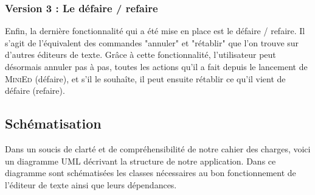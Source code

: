 \documentclass[a4paper]{article}
\begin{document}
			\subsubsection{Version 3 : Le défaire / refaire}

			Enfin, la dernière fonctionnalité qui a été mise en place est le défaire / refaire. Il s'agit de l'équivalent des commandes "annuler" et "rétablir" que l'on trouve sur d'autres éditeurs de texte. Grâce à cette fonctionnalité, l'utilisateur peut désormais annuler pas à pas, toutes les actions qu'il a fait depuis le lancement de \textsc{MiniEd} (défaire), et s'il le souhaîte, il peut ensuite rétablir ce qu'il vient de défaire (refaire).

			\vspace{0.5cm}

		\subsection{Schématisation}

		\vspace{0.5cm}

		Dans un soucis de clarté et de compréhensibilité de notre cahier des charges, voici un diagramme UML décrivant la structure de notre application. Dans ce diagramme sont schématisées les classes nécessaires au bon fonctionnement de l’éditeur de texte ainsi que leurs dépendances.
\end{document}
